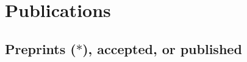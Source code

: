 \documentclass[letterpaper,11pt]{article}
\begin{document}
\section*{Publications}

%


\subsection*{Preprints ($*$), accepted, or published}
\end{document}

